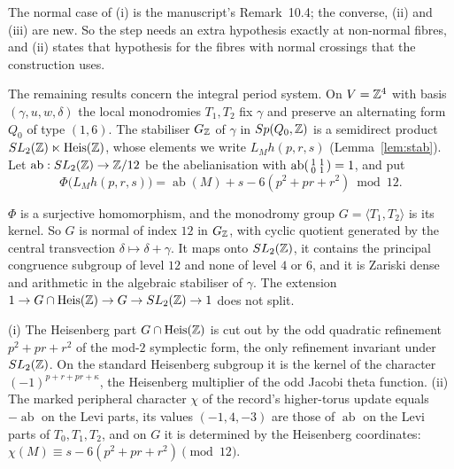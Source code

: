 The normal case of (i) is the manuscript's Remark~10.4; the converse, (ii) and (iii) are new. So the step needs an extra hypothesis exactly at non-normal fibres, and (ii) states that hypothesis for the fibres with normal crossings that the construction uses.

The remaining results concern the integral period system. On $V=\mathbb{Z}^4$ with basis $(\gamma,u,w,\delta)$ the local monodromies $T_1,T_2$ fix $\gamma$ and preserve an alternating form $Q_0$ of type $(1,6)$. The stabiliser $G_{\mathbb{Z}}$ of $\gamma$ in $Sp(Q_0,\mathbb{Z})$ is a semidirect product $SL_2(\mathbb{Z})\ltimes\mathrm{Heis}(\mathbb{Z})$, whose elements we write $L_Mh(p,r,s)$ (Lemma~\ref{lem:stab}). Let $\operatorname{ab}:SL_2(\mathbb{Z})\to\mathbb{Z}/12$ be the abelianisation with $\operatorname{ab}\begin{psmallmatrix}1&1\\0&1\end{psmallmatrix}=1$, and put
\[
\Phi\bigl(L_Mh(p,r,s)\bigr)=\operatorname{ab}(M)+s-6(p^2+pr+r^2)\bmod12 .
\]

\begin{introthm}
$\Phi$ is a surjective homomorphism, and the monodromy group $G=\langle T_1,T_2\rangle$ is its kernel. So $G$ is normal of index $12$ in $G_{\mathbb{Z}}$, with cyclic quotient generated by the central transvection $\delta\mapsto\delta+\gamma$. It maps onto $SL_2(\mathbb{Z})$, it contains the principal congruence subgroup of level $12$ and none of level $4$ or $6$, and it is Zariski dense and arithmetic in the algebraic stabiliser of $\gamma$. The extension $1\to G\cap\mathrm{Heis}(\mathbb{Z})\to G\to SL_2(\mathbb{Z})\to1$ does not split.
\end{introthm}

\begin{introthm}
\textup{(i)} The Heisenberg part $G\cap\mathrm{Heis}(\mathbb{Z})$ is cut out by the odd quadratic refinement $p^2+pr+r^2$ of the mod-$2$ symplectic form, the only refinement invariant under $SL_2(\mathbb{Z})$. On the standard Heisenberg subgroup it is the kernel of the character $(-1)^{p+r+pr+\kappa}$, the Heisenberg multiplier of the odd Jacobi theta function.
\textup{(ii)} The marked peripheral character $\chi$ of the record's higher-torus update equals $-\operatorname{ab}$ on the Levi parts, its values $(-1,4,-3)$ are those of $\operatorname{ab}$ on the Levi parts of $T_0,T_1,T_2$, and on $G$ it is determined by the Heisenberg coordinates: $\chi(M)\equiv s-6(p^2+pr+r^2)\pmod{12}$.
\end{introthm}

